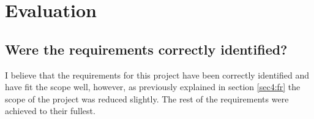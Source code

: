 \chapter{Evaluation}








\section{Were the requirements correctly identified?}
I believe that the requirements for this project have been correctly identified and have fit the scope well, however, as previously explained in section \ref{sec4:fr} the scope of the project was reduced slightly. The rest of the requirements were achieved to their fullest.

